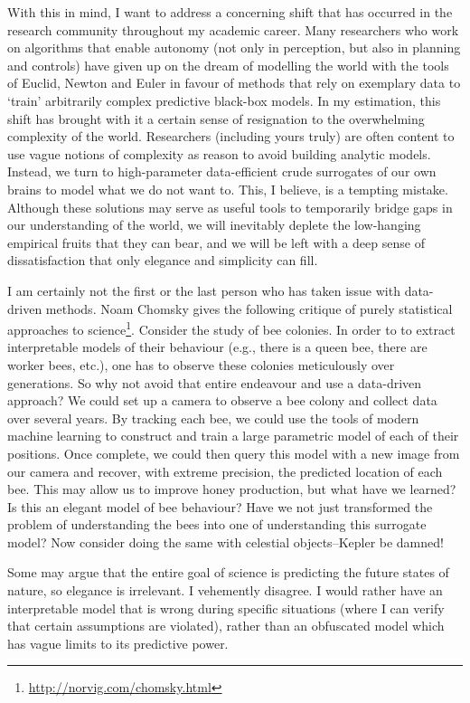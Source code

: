 With this in mind, I want to address a concerning shift that has occurred in the research community throughout my academic career. Many researchers who work on algorithms that enable autonomy (not only in perception, but also in planning and controls) have given up on the dream of modelling the world with the tools of Euclid, Newton and Euler in favour of methods that rely on exemplary data to `train' arbitrarily complex predictive black-box models. In my estimation, this shift has brought with it a certain sense of resignation to the overwhelming complexity of the world. Researchers (including yours truly) are often content to use vague notions of complexity as reason to avoid building analytic models. Instead, we turn to high-parameter data-efficient crude surrogates of our own brains to model what we do not want to. This, I believe, is a tempting mistake. Although these solutions may serve as useful tools to temporarily bridge gaps in our understanding of the world, we will inevitably deplete the low-hanging empirical fruits that they can bear, and we will be left with a deep sense of dissatisfaction that only elegance and simplicity can fill. 

I am certainly not the first or the last person who has taken issue with data-driven methods. Noam Chomsky gives the following critique of purely statistical approaches to science\footnote{\url{http://norvig.com/chomsky.html}}. Consider the study of bee colonies. In order to to extract interpretable models of their behaviour (e.g., there is a queen bee, there are worker bees, etc.), one has to observe these colonies meticulously over generations. So why not avoid that entire endeavour and use a data-driven approach? We could set up a camera to observe a bee colony and collect data over several years. By tracking each bee, we could use the tools of modern machine learning to construct and train a large parametric model of each of their positions. Once complete, we could then query this model with a new image from our camera and recover, with extreme precision, the predicted location of each bee. This may allow us to improve honey production, but what have we learned? Is this an elegant model of bee behaviour? Have we not just transformed the problem of understanding the bees into one of understanding this surrogate model? Now consider doing the same with celestial objects--Kepler be damned!

Some may argue that the entire goal of science is predicting the future states of nature, so elegance is irrelevant. I vehemently disagree. I would rather have an interpretable model that is wrong during specific situations (where I can verify that certain assumptions are violated), rather than an obfuscated model which has vague limits to its predictive power.

